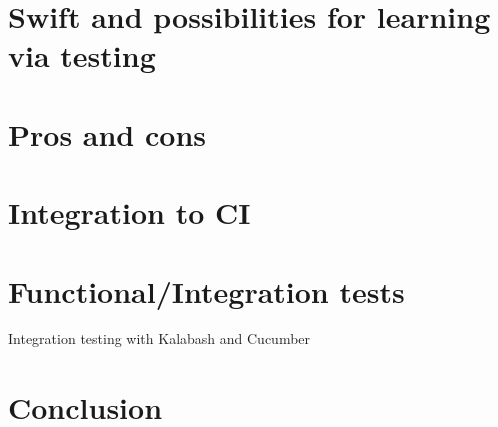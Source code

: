 \documentclass[a4paper, titlepage]{article}
\begin{document}
  \section{Swift and possibilities for learning via testing}
\section{Pros and cons}
\section{Integration to CI}
\section{Functional/Integration tests}\label{sec:integration tests}
  Integration testing with Kalabash and Cucumber
\section{Conclusion}
  
\end{document}
